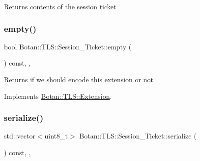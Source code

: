 \begin{DoxyReturn}{Returns}
contents of the session ticket 
\end{DoxyReturn}
\mbox{\label{class_botan_1_1_t_l_s_1_1_session___ticket_a6796d47c184b69f1eaf5bcee582a4ebe}} 
\subsubsection{\texorpdfstring{empty()}{empty()}}
{\footnotesize\ttfamily bool Botan\+::\+T\+L\+S\+::\+Session\+\_\+\+Ticket\+::empty (\begin{DoxyParamCaption}{ }\end{DoxyParamCaption}) const\hspace{0.3cm}{\ttfamily [inline]}, {\ttfamily [override]}, {\ttfamily [virtual]}}

\begin{DoxyReturn}{Returns}
if we should encode this extension or not 
\end{DoxyReturn}


Implements \hyperlink{class_botan_1_1_t_l_s_1_1_extension_aa850b9be2322f94e7c65e583cd51acc5}{Botan\+::\+T\+L\+S\+::\+Extension}.

\mbox{\label{class_botan_1_1_t_l_s_1_1_session___ticket_a446a320f05bfc710740defcd5ac0ca58}} 
\subsubsection{\texorpdfstring{serialize()}{serialize()}}
{\footnotesize\ttfamily std\+::vector$<$uint8\+\_\+t$>$ Botan\+::\+T\+L\+S\+::\+Session\+\_\+\+Ticket\+::serialize (\begin{DoxyParamCaption}{ }\end{DoxyParamCaption}) const\hspace{0.3cm}{\ttfamily [inline]}, {\ttfamily [override]}, {\ttfamily [virtual]}}

